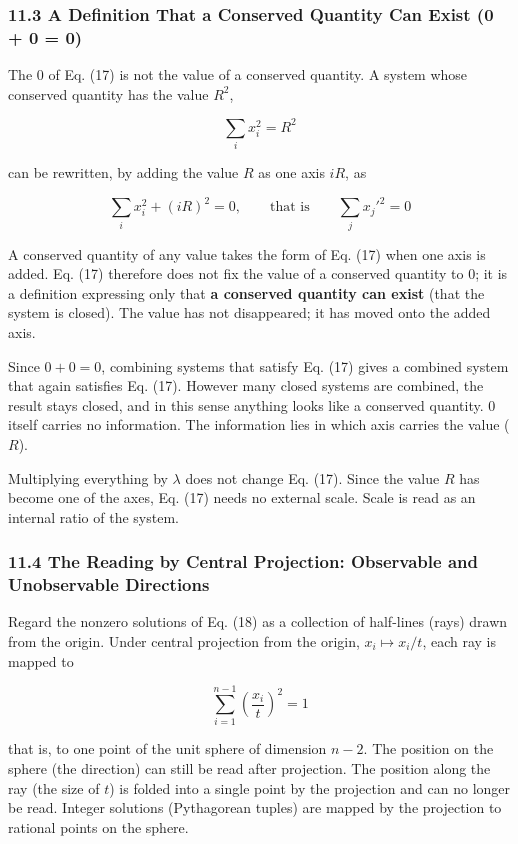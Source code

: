 \documentclass[
  a4paper,
]{article}
\begin{document}
\subsubsection{11.3 A Definition That a Conserved Quantity Can Exist (0
+ 0 = 0)}\label{a-definition-that-a-conserved-quantity-can-exist-0-0-0}

The 0 of Eq. (17) is not the value of a conserved quantity. A system
whose conserved quantity has the value \(R^2\),

\[
\sum_i x_i^2=R^2
\]

can be rewritten, by adding the value \(R\) as one axis \(iR\), as

\[
\sum_i x_i^2+(iR)^2=0,\qquad\text{that is}\qquad \sum_j x_j'^2=0
\tag{18a}
\]

A conserved quantity of any value takes the form of Eq. (17) when one
axis is added. Eq. (17) therefore does not fix the value of a conserved
quantity to 0; it is a definition expressing only that \textbf{a
conserved quantity can exist} (that the system is closed). The value has
not disappeared; it has moved onto the added axis.

Since \(0+0=0\), combining systems that satisfy Eq. (17) gives a
combined system that again satisfies Eq. (17). However many closed
systems are combined, the result stays closed, and in this sense
anything looks like a conserved quantity. 0 itself carries no
information. The information lies in which axis carries the value
(\(R\)).

Multiplying everything by \(\lambda\) does not change Eq. (17). Since
the value \(R\) has become one of the axes, Eq. (17) needs no external
scale. Scale is read as an internal ratio of the system.

\subsubsection{11.4 The Reading by Central Projection: Observable and
Unobservable
Directions}\label{the-reading-by-central-projection-observable-and-unobservable-directions}

Regard the nonzero solutions of Eq. (18) as a collection of half-lines
(rays) drawn from the origin. Under central projection from the origin,
\(x_i\mapsto x_i/t\), each ray is mapped to

\[
\sum_{i=1}^{n-1}\left(\frac{x_i}{t}\right)^2=1
\]

that is, to one point of the unit sphere of dimension \(n-2\). The
position on the sphere (the direction) can still be read after
projection. The position along the ray (the size of \(t\)) is folded
into a single point by the projection and can no longer be read. Integer
solutions (Pythagorean tuples) are mapped by the projection to rational
points on the sphere.
\end{document}
